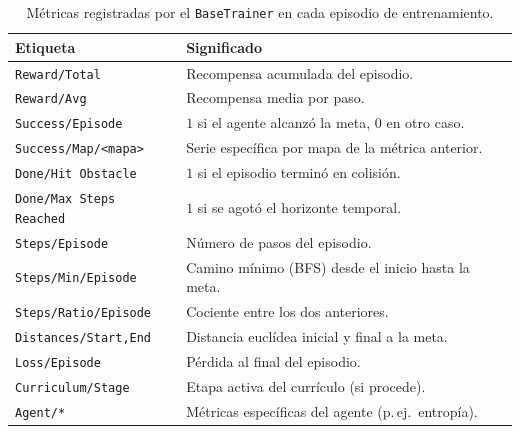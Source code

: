 \begin{table}[htbp]
    \centering
    \caption{Métricas registradas por el \texttt{BaseTrainer} en cada
    episodio de entrenamiento.}
    \label{tab:tensorboard_tags}
    \begin{tabular}{ll}
        \toprule
        \textbf{Etiqueta} & \textbf{Significado} \\
        \midrule
        \texttt{Reward/Total}             & Recompensa acumulada del episodio. \\
        \texttt{Reward/Avg}               & Recompensa media por paso. \\
        \texttt{Success/Episode}          & $1$ si el agente alcanzó la meta, $0$ en otro caso. \\
        \texttt{Success/Map/<mapa>}       & Serie específica por mapa de la métrica anterior. \\
        \texttt{Done/Hit Obstacle}        & $1$ si el episodio terminó en colisión. \\
        \texttt{Done/Max Steps Reached}   & $1$ si se agotó el horizonte temporal. \\
        \texttt{Steps/Episode}            & Número de pasos del episodio. \\
        \texttt{Steps/Min/Episode}        & Camino mínimo (BFS) desde el inicio hasta la meta. \\
        \texttt{Steps/Ratio/Episode}      & Cociente entre los dos anteriores. \\
        \texttt{Distances/Start,End}      & Distancia euclídea inicial y final a la meta. \\
        \texttt{Loss/Episode}             & Pérdida al final del episodio. \\
        \texttt{Curriculum/Stage}         & Etapa activa del currículo (si procede). \\
        \texttt{Agent/*}                  & Métricas específicas del agente (p.\,ej.\ entropía). \\
        \bottomrule
    \end{tabular}
\end{table}

